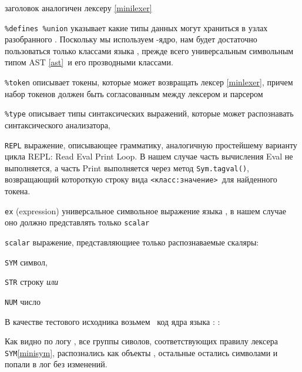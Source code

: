 \begin{description}
\item{} заголовок аналогичен лексеру \ref{minilexer}
\item{\verb|%defines %union|} указывает какие типы данных могут храниться в
узлах разобранного .
Поскольку мы используем \bi-ядро, нам будет достаточно пользоваться
только классами языка \bi,
прежде всего универсальным символьным типом AST \ref{ast}\ и его прозводными
классами.
\item{\verb|%token|} описывает токены, которые может возвращать лексер
\ref{minlexer}, причем набор токенов должен быть согласованным между лексером и
парсером
\item{\verb|%type|} описывает типы синтаксических выражений, которые может
распознавать  синтаксического анализатора, 
\item{\verb|REPL|} выражение, описывающее грамматику, аналогичную простейшему
варианту цикла REPL: Read Eval Print
Loop. В нашем случае часть вычисления
Eval не выполняется, а часть Print
выполняется через метод \verb|Sym.tagval()|, возвращающий котороткую строку
вида \verb|<класс:значение>|\ для найденного токена.
\item{\verb|ex|} (expression) универсальное символьное выражение языка \bi, в
нашем случае оно должно представлять только \verb|scalar|
\item{\verb|scalar|} выражение, представляющиее только распознаваемые скаляры:
\item{\verb|SYM|} символ, 
\item{\verb|STR|} строку \emph{или}
\item{\verb|NUM|} число
\end{description}

В качестве тестового исходника возьмем \cpp\ код ядра языка \bi:
:



Как видно по логу , все группы сиволов, соответствующих
правилу лексера \verb|SYM|\ref{minisym}, распознались как объекты \bi, остальные
остались символами и попали в лог без изменений.
